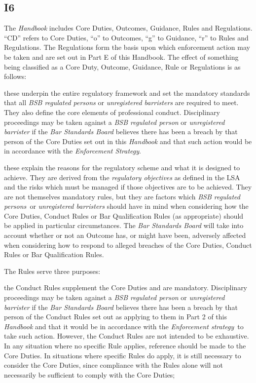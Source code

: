 \subsection{I6}

The \emph{Handbook} includes Core Duties, Outcomes, Guidance, Rules and
Regulations. ``CD'' refers to Core Duties, ``o'' to Outcomes, ``g'' to
Guidance, ``r'' to Rules and Regulations. The Regulations form the basis
upon which enforcement action may be taken and are set out in Part E of
this Handbook. The effect of something being classified as a Core Duty,
Outcome, Guidance, Rule or Regulations is as follows:
\begin{numlist}\item {} these underpin the entire regulatory
framework and set the mandatory standards that all \emph{BSB regulated
persons} or \emph{unregistered barristers} are required to meet. They
also define the core elements of professional conduct. Disciplinary
proceedings may be taken against a \emph{BSB regulated person} or
\emph{unregistered barrister} if the \emph{Bar Standards Board} believes
there has been a breach by that person of the Core Duties set out in
this \emph{Handbook} and that such action would be in accordance with
the \emph{Enforcement Strategy}.
\item {} these explain the reasons for the regulatory
scheme and what it is designed to achieve. They are derived from the
\emph{regulatory objectives} as defined in the LSA and the risks which
must be managed if those objectives are to be achieved. They are not
themselves mandatory rules, but they are factors which \emph{BSB
regulated persons~}or \emph{unregistered barristers} should have in mind
when considering how the Core Duties, Conduct Rules or Bar Qualification
Rules (as appropriate) should be applied in particular circumstances.
The \emph{Bar Standards Board} will take into account whether or not an
Outcome has, or might have been, adversely affected when considering how
to respond to alleged breaches of the Core Duties, Conduct Rules or Bar
Qualification Rules.
 \item {} The Rules serve three purposes:
\begin{alphlist}
\item the Conduct Rules supplement the Core Duties and are mandatory.
Disciplinary proceedings may be taken against a \emph{BSB regulated
person} or \emph{unregistered barrister} if the \emph{Bar Standards
\emph{Board}} believes there has been a breach by that person of the
Conduct Rules set out as applying to them in Part 2 of this
\emph{Handbook} and that it would be in accordance with the
\emph{Enforcement strategy}~to take such action. However, the Conduct
Rules are not intended to be exhaustive. In any situation where no
specific Rule applies, reference should be made to the Core Duties. In
situations where specific Rules do apply, it is still necessary to
consider the Core Duties, since compliance with the Rules alone will not
necessarily be sufficient to comply with the Core Duties;


\end{alphlist}
\end{numlist}
